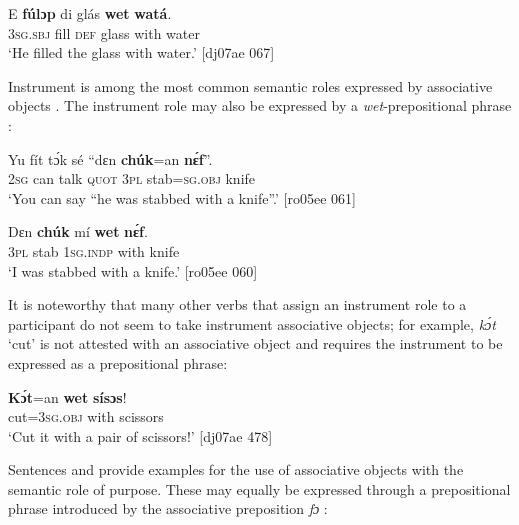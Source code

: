 \ea%
    \label{ex:key:1176}
    \gll E    \textbf{fúlɔp}  di  glás    \textbf{wet}    \textbf{watá}.\\
\textsc{3sg.sbj}  fill    \textsc{def}  glass  with    water\\

\glt ‘He filled the glass with water.’ [dj07ae 067]
\z

Instrument is among the most common semantic roles expressed by associative objects . The instrument role may also be expressed by a \textit{wet}{}-prepositional phrase :


\ea%
    \label{ex:key:1177}
    \gll Yu  fít  tɔ́k  sé   “dɛn    \textbf{chúk}=an    \textbf{nɛ́f}”.\\
\textsc{2sg}  can  talk  \textsc{quot}    \phantom{‘}\textsc{3pl}    {stab=\textsc{sg}.\textsc{obj}}  knife\\

\glt ‘You can say “he was stabbed with a knife”.’ [ro05ee 061]
\z


\ea%
    \label{ex:key:1178}
    \gll Dɛn  \textbf{chúk}  mí    \textbf{wet}    \textbf{nɛ́f}.\\
\textsc{3pl}  stab    \textsc{1sg.indp}  with    knife\\

\glt ‘I was stabbed with a knife.’ [ro05ee 060]
\z

It is noteworthy that many other verbs that assign an instrument role to a participant do not seem to take instrument associative objects; for example, \textit{kɔ́t} ‘cut’ is not attested with an associative object and requires the instrument to be expressed as a prepositional phrase: 


\z


\ea%
    \label{ex:key:1180}
    \gll \textbf{Kɔ́t}=an    \textbf{wet}    \textbf{sísɔs}!\\
cut=\textsc{3sg.obj}  with    scissors\\

\glt ‘Cut it with a pair of scissors!’ [dj07ae 478]
\z

Sentences  and  provide examples for the use of associative objects with the semantic role of purpose. These may equally be expressed through a prepositional phrase introduced by the associative preposition \textit{fɔ} : 


